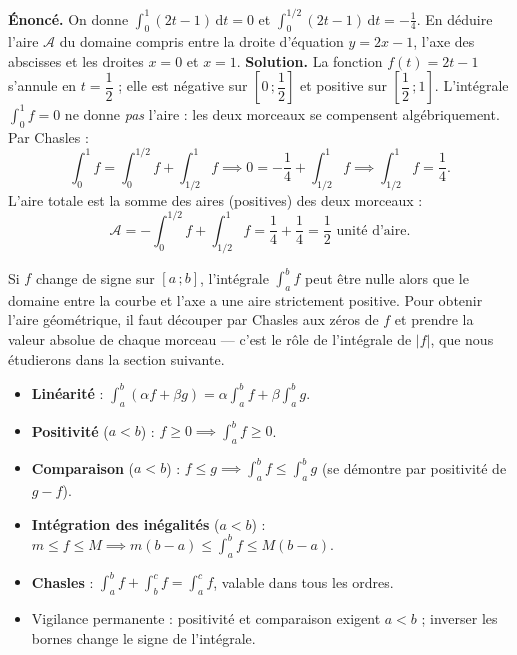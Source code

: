 \documentclass[11pt]{article}
\begin{document}
\begin{exoresolu}
\textbf{Énoncé.} On donne $\displaystyle\int_0^1 (2t-1)\,\mathrm{d}t = 0$ et $\displaystyle\int_0^{1/2} (2t-1)\,\mathrm{d}t = -\frac{1}{4}$. En déduire l'aire $\mathcal{A}$ du domaine compris entre la droite d'équation $y = 2x - 1$, l'axe des abscisses et les droites $x = 0$ et $x = 1$.
\tcblower
\textbf{Solution.} La fonction $f(t) = 2t - 1$ s'annule en $t = \dfrac{1}{2}$ ; elle est négative sur $\left[0\,;\dfrac{1}{2}\right]$ et positive sur $\left[\dfrac{1}{2}\,;1\right]$. L'intégrale $\int_0^1 f = 0$ ne donne \emph{pas} l'aire : les deux morceaux se compensent algébriquement. Par Chasles :
\[ \int_0^1 f = \int_0^{1/2} f + \int_{1/2}^1 f \implies 0 = -\frac{1}{4} + \int_{1/2}^1 f \implies \int_{1/2}^1 f = \frac{1}{4}. \]
L'aire totale est la somme des aires (positives) des deux morceaux :
\[ \mathcal{A} = -\int_0^{1/2} f + \int_{1/2}^1 f = \frac{1}{4} + \frac{1}{4} = \frac{1}{2} \text{ unité d'aire}. \]
\end{exoresolu}

\begin{attention}
Si $f$ change de signe sur $[a\,;b]$, l'intégrale $\int_a^b f$ peut être nulle alors que le domaine entre la courbe et l'axe a une aire strictement positive. Pour obtenir l'aire géométrique, il faut découper par Chasles aux zéros de $f$ et prendre la valeur absolue de chaque morceau — c'est le rôle de l'intégrale de $|f|$, que nous étudierons dans la section suivante.
\end{attention}

\begin{aretenir}
\begin{itemize}
\item \textbf{Linéarité} : $\displaystyle\int_a^b (\alpha f + \beta g) = \alpha \int_a^b f + \beta \int_a^b g$.
\item \textbf{Positivité} ($a < b$) : $f \geq 0 \implies \displaystyle\int_a^b f \geq 0$.
\item \textbf{Comparaison} ($a < b$) : $f \leq g \implies \displaystyle\int_a^b f \leq \int_a^b g$ (se démontre par positivité de $g - f$).
\item \textbf{Intégration des inégalités} ($a < b$) : $m \leq f \leq M \implies m(b-a) \leq \displaystyle\int_a^b f \leq M(b-a)$.
\item \textbf{Chasles} : $\displaystyle\int_a^b f + \int_b^c f = \int_a^c f$, valable dans tous les ordres.
\item Vigilance permanente : positivité et comparaison exigent $a < b$ ; inverser les bornes change le signe de l'intégrale.
\end{itemize}
\end{aretenir}
\end{document}
